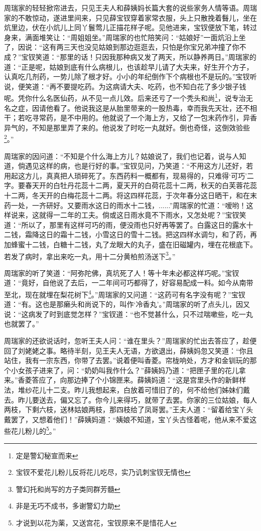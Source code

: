 \documentclass[12pt,oneside]{book}
\begin{document}
周瑞家的轻轻掀帘进去，只见王夫人和薛姨妈长篇大套的说些家务人情等语。周瑞家的不敢惊动，遂进里间来，只见薛宝钗穿着家常衣服，头上只散挽着䰖儿，坐在炕里边，伏在小炕儿上同丫鬟莺儿正描花样子呢。见他进来，宝钗便放下笔，转过身来，满面堆笑让：“周姐姐坐。”周瑞家的也忙陪笑问：“姑娘好”一面炕沿上坐了，因说：“这有两三天也没见姑娘到那边逛逛去，只怕是你宝兄弟冲撞了你不成？”宝钗笑道：“那里的话！只因我那种病又发了两天，所以静养两日。”周瑞家的道：“正是呢，姑娘到底有什么病根儿，也该趁早儿请了大夫来，好生开个方子，认真吃几剂药，一势儿除了根才好。小小的年纪倒作下个病根也不是玩的。”宝钗听说，便笑道：“再不要提吃药。为这病请大夫、吃药，也不知白花了多少银子钱呢。凭你什么名医仙药，从不见一点儿效。后来还亏了一个秃头和尚\footnote{定是警幻秘宣而来}，说专治无名之症，因请他看了。他说我这是从胎里带来的一股热毒，幸而我先天壮，还不相干；若吃寻常药，是不中用的。他就说了一个海上方，又给了一包末药作引，异香异气的，不知是那里弄了来的。他说发了时吃一丸就好。倒也奇怪，这倒效验些\footnote{宝钗不爱花儿粉儿反将花儿吃尽，实乃讥刺宝钗无情也}。”

周瑞家的因问道：“不知是个什么海上方儿？姑娘说了，我们也记着，说与人知道，倘遇见这样的病，也是行好的事。”宝钗见问，乃笑道：“不用这方儿还好，若用起这方儿，真真把人琐碎死了。东西药料一概都有，现易得的，只难得‘可巧’二字。要春天开的白牡丹花蕊十二两，夏天开的白荷花蕊十二两，秋天的白芙蓉花蕊十二两，冬天开的白梅花蕊十二两。将这四样花蕊，于次年春分这日晒干，和在末药一处，一齐研好。又要雨水这日的雨水十二钱，......”周瑞家的忙道：“嗳哟！这样说来，这就得一二年的工夫。倘或这日雨水竟不下雨水，又怎处呢？”宝钗笑道：“所以了，那里有这样可巧的雨，便没雨也只好再等罢了。白露这日的露水十二钱，霜降这日的霜十二钱，小雪这日的雪十二钱。把这四样水调匀，和了药，再加蜂蜜十二钱，白糖十二钱，丸了龙眼大的丸子，盛在旧磁罐内，埋在花根底下。若发了病时，拿出来吃一丸，用十二分黄柏煎汤送下\footnote{警幻托和尚写的方子类同群芳髓}。”

周瑞家的听了笑道：“阿弥陀佛，真坑死了人！等十年未必都这样巧呢。”宝钗道：“竟好，自他说了去后，一二年间可巧都得了，好容易配成一料。如今从南带至北，现在就埋在梨花树下\footnote{非是无巧不成书，多谢警幻力助}。”周瑞家的又问道：“这药可有名字没有呢？”宝钗道：“有。这也是那癞头和尚说下的，叫作‘冷香丸’。”周瑞家的听了点头儿，因又说：“这病发了时到底觉怎样？”宝钗道：“也不觉甚什么，只不过喘嗽些，吃一丸也就罢了。”

周瑞家的还欲说话时，忽听王夫人问：“谁在里头？”周瑞家的忙出去答应了，趁便回了刘姥姥之事。略待半刻，见王夫人无语，方欲退出，薛姨妈忽又笑道：“你且站住，我有一宗东西，你带了去罢。”说着便叫香菱。帘栊响处，方才和金钏玩的那个小女孩子进来了，问：“奶奶叫我作什么？”薛姨妈乃道：“把匣子里的花儿拿来。”香菱答应了，向那边捧了个小锦匣来。薛姨妈道：“这是宫里头作的新鲜样法，堆纱花儿十二支。昨儿我想起来，白放着可惜旧了的，何不给他们姊妹们戴去。昨儿要送去，偏又忘了。你今儿来得巧，就带了去罢。你家的三位姑娘，每人两枝，下剩六枝，送林姑娘两枝，那四枝给了凤哥罢。”王夫人道：“留着给宝丫头戴罢了，又想着他们！”薛姨妈道：“姨娘不知道，宝丫头古怪着呢，他从来不爱这些花儿粉儿的\footnote{才说到以花为薬，又送宫花，宝钗原来不是惜花人}。”
\end{document}
